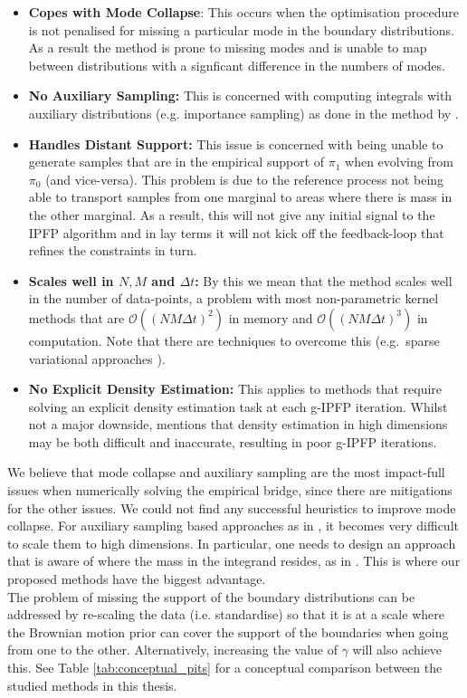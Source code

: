 \documentclass[a4paper,12pt,twoside,openright]{report}
\theoremstyle{definition}
\begin{document}
\begin{itemize}
    \item \textbf{Copes with Mode Collapse}: This occurs when the optimisation procedure is not penalised for missing a particular mode in the boundary distributions. As a result the method is prone to missing modes and is unable to map between distributions with a signficant difference in the numbers of modes.
    \item \textbf{No Auxiliary Sampling:} This is concerned with computing integrals with auxiliary distributions (e.g. importance sampling) as done in the method by \cite{pavon2018data}.
    \item \textbf{Handles Distant Support:} This issue is concerned with being unable to generate samples that are in the empirical support of $\pi_1$ when evolving from $\pi_0$ (and vice-versa). This problem is due to the reference process not being able to transport samples from one marginal to areas where there is mass in the other marginal. As a result, this will not give any initial signal to the IPFP algorithm and in lay terms it will not kick off the feedback-loop that refines the constraints in turn.
    \item \textbf{Scales well in $N,M$ and $\Delta t$:} By this we mean that the method scales well in the number of data-points, a problem with most non-parametric kernel methods that are $\mathcal{O}((NM\Delta t)^2)$ in memory and $\mathcal{O}((N M\Delta t)^3)$ in computation. Note that there are techniques to overcome this (e.g.\ sparse variational approaches \citep{van2019sparse}).
    \item \textbf{No Explicit Density Estimation:} This applies to methods that require solving an explicit density estimation task at each g-IPFP iteration. Whilst not a major downside,  \cite{pavon2018data} mentions that density estimation in high dimensions may be both difficult and inaccurate, resulting in poor g-IPFP iterations.
\end{itemize}
We believe that mode collapse  and auxiliary sampling are the most impact-full issues when numerically solving the empirical bridge, since there are mitigations for the other issues. We could not find any successful heuristics to improve mode collapse. For auxiliary sampling based approaches as in \cite{pavon2018data}, it becomes very difficult to scale them to high dimensions. In particular, one needs to design an approach that is aware of where the mass in the integrand resides, as in \cite{osborne2012active}. This is where our proposed methods have the biggest advantage.
\\The problem of missing the support of the boundary distributions can be addressed by re-scaling the data (i.e. standardise) so that it is at a scale where the Brownian motion prior can cover the support of the boundaries when going from one to the other. Alternatively, increasing the value of $\gamma$ will also achieve this. See Table \ref{tab:conceptual_pits} for a conceptual comparison between the studied methods in this thesis.
\end{document}
